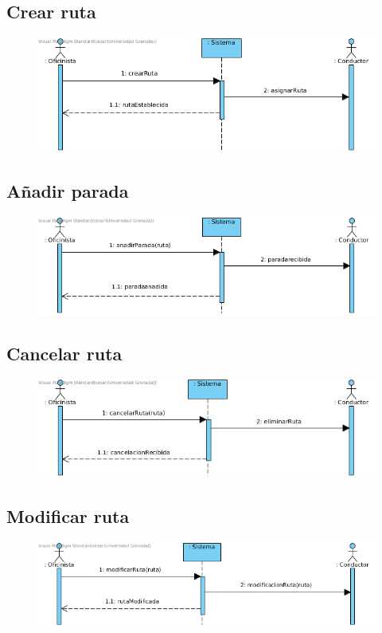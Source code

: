 \subsection{Crear ruta}
\begin{figure}[H]
	\centering
	\includegraphics[width=16cm]{29}
\end{figure}
\subsection{Añadir parada}
\begin{figure}[H]
	\centering
	\includegraphics[width=16cm]{30}
\end{figure}
\subsection{Cancelar ruta}
\begin{figure}[H]
	\centering
	\includegraphics[width=16cm]{31}
\end{figure}
\subsection{Modificar ruta}
\begin{figure}[H]
	\centering
	\includegraphics[width=16cm]{32}
\end{figure}
